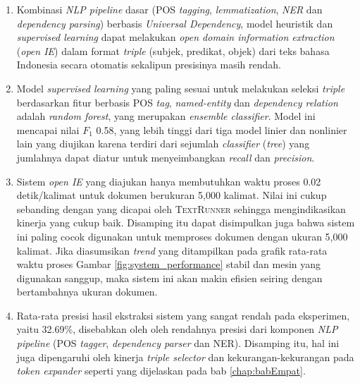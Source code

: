 \begin{enumerate}
	\item Kombinasi \textit{NLP pipeline} dasar (POS \textit{tagging}, \textit{lemmatization}, \textit{NER} dan \textit{dependency parsing}) berbasis \textit{Universal Dependency}, model heuristik dan \textit{supervised learning} dapat melakukan \textit{open domain information extraction} (\textit{open IE}) dalam format \textit{triple} (subjek, predikat, objek) dari teks bahasa Indonesia secara otomatis sekalipun presisinya masih rendah.
	
	\item Model \textit{supervised learning} yang paling sesuai untuk melakukan seleksi \textit{triple} berdasarkan fitur berbasis POS \textit{tag}, \textit{named-entity} dan \textit{dependency relation} adalah \textit{random forest}, yang merupakan \textit{ensemble classifier}. Model ini mencapai nilai $F_1$ 0.58, yang lebih tinggi dari tiga model linier dan nonlinier lain yang diujikan karena terdiri dari sejumlah \textit{classifier} (\textit{tree}) yang jumlahnya dapat diatur untuk menyeimbangkan \textit{recall} dan \textit{precision}.
	
	\item Sistem \textit{open IE} yang diajukan hanya membutuhkan waktu proses 0.02 detik/kalimat untuk dokumen berukuran 5,000 kalimat. Nilai ini cukup sebanding dengan yang dicapai oleh \textsc{TextRunner} \citep{banko2007open} sehingga mengindikasikan kinerja yang cukup baik. Disamping itu dapat disimpulkan juga bahwa sistem ini paling cocok digunakan untuk memproses dokumen dengan ukuran 5,000 kalimat. Jika diasumsikan \textit{trend} yang ditampilkan pada grafik rata-rata waktu proses Gambar \ref{fig:system_performance} stabil dan mesin yang digunakan sanggup, maka sistem ini akan makin efisien seiring dengan bertambahnya ukuran dokumen.
	
	\item Rata-rata presisi hasil ekstraksi sistem yang sangat rendah pada eksperimen, yaitu 32.69\%, disebabkan oleh oleh rendahnya presisi dari komponen \textit{NLP pipeline} (POS \textit{tagger}, \textit{dependency parser} dan NER). Disamping itu, hal ini juga dipengaruhi oleh kinerja \textit{triple selector} dan kekurangan-kekurangan pada \textit{token expander} seperti yang dijelaskan pada bab \ref{chap:babEmpat}.
	
\end{enumerate}


